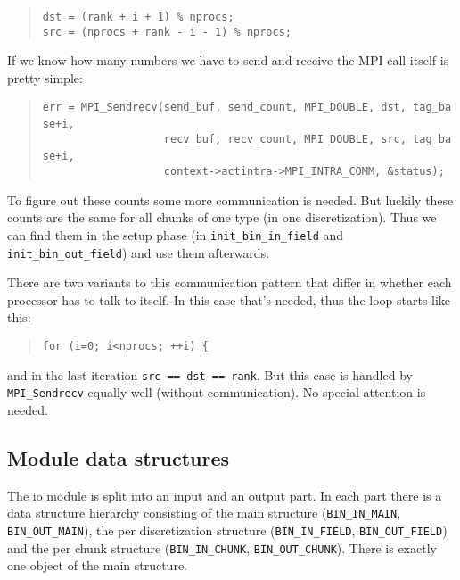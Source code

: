 \begin{quote}
\texttt{dst~=~(rank~+~i~+~1)~{\%}~nprocs;~}~\\
 \texttt{src~=~(nprocs~+~rank~-~i~-~1)~{\%}~nprocs; }
\end{quote}
If we know how many numbers we have to send and receive the MPI call
itself is pretty simple: 

\begin{quote}
\texttt{err~=~MPI{\_}Sendrecv(send{\_}buf,~send{\_}count,~MPI{\_}DOUBLE,~dst,~tag{\_}base+i,~}~\\
 \texttt{~~~~~~~~~~~~~~~~~~~recv{\_}buf,~recv{\_}count,~MPI{\_}DOUBLE,~src,~tag{\_}base+i,~}~\\
 \texttt{~~~~~~~~~~~~~~~~~~~context->actintra->MPI{\_}INTRA{\_}COMM,~{\&}status); }
\end{quote}
To figure out these counts some more communication is needed. But
luckily these counts are the same for all chunks of one type (in one
discretization). Thus we can find them in the setup phase (in \texttt{init{\_}bin{\_}in{\_}field}
and \texttt{init{\_}bin{\_}out{\_}field}) and use them afterwards.

There are two variants to this communication pattern that differ in
whether each processor has to talk to itself. In this case that's
needed, thus the loop starts like this: 

\begin{quote}
\texttt{for~(i=0;~i<nprocs;~++i)~{\{} }
\end{quote}
and in the last iteration \texttt{src == dst == rank}. But this case
is handled by \texttt{MPI{\_}Sendrecv} equally well (without communication).
No special attention is needed.


\subsection{Module data structures}

The io module is split into an input and an output part. In each part
there is a data structure hierarchy consisting of the main structure
(\texttt{BIN{\_}IN{\_}MAIN}, \texttt{BIN{\_}OUT{\_}MAIN}),
the per discretization structure (\texttt{BIN{\_}IN{\_}FIELD},
\texttt{BIN{\_}OUT{\_}FIELD}) and the per chunk structure (\texttt{BIN{\_}IN{\_}CHUNK},
\texttt{BIN{\_}OUT{\_}CHUNK}). There is exactly one object of
the main structure.
